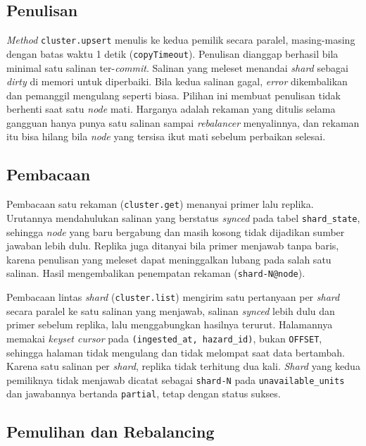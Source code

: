 \subsection{Penulisan}

\textit{Method} \texttt{cluster.upsert} menulis ke kedua pemilik secara paralel, masing-masing dengan batas waktu 1 detik (\texttt{copyTimeout}). Penulisan dianggap berhasil bila minimal satu salinan ter-\textit{commit}. Salinan yang meleset menandai \textit{shard} sebagai \textit{dirty} di memori untuk diperbaiki. Bila kedua salinan gagal, \textit{error} dikembalikan dan pemanggil mengulang seperti biasa. Pilihan ini membuat penulisan tidak berhenti saat satu \textit{node} mati. Harganya adalah rekaman yang ditulis selama gangguan hanya punya satu salinan sampai \textit{rebalancer} menyalinnya, dan rekaman itu bisa hilang bila \textit{node} yang tersisa ikut mati sebelum perbaikan selesai.

\subsection{Pembacaan}

Pembacaan satu rekaman (\texttt{cluster.get}) menanyai primer lalu replika. Urutannya mendahulukan salinan yang berstatus \textit{synced} pada tabel \texttt{shard\_state}, sehingga \textit{node} yang baru bergabung dan masih kosong tidak dijadikan sumber jawaban lebih dulu. Replika juga ditanyai bila primer menjawab tanpa baris, karena penulisan yang meleset dapat meninggalkan lubang pada salah satu salinan. Hasil mengembalikan penempatan rekaman (\texttt{shard-N@node}).

Pembacaan lintas \textit{shard} (\texttt{cluster.list}) mengirim satu pertanyaan per \textit{shard} secara paralel ke satu salinan yang menjawab, salinan \textit{synced} lebih dulu dan primer sebelum replika, lalu menggabungkan hasilnya terurut. Halamannya memakai \textit{keyset cursor} pada \texttt{(ingested\_at, hazard\_id)}, bukan \texttt{OFFSET}, sehingga halaman tidak mengulang dan tidak melompat saat data bertambah. Karena satu salinan per \textit{shard}, replika tidak terhitung dua kali. \textit{Shard} yang kedua pemiliknya tidak menjawab dicatat sebagai \texttt{shard-N} pada \texttt{unavailable\_units} dan jawabannya bertanda \texttt{partial}, tetap dengan status sukses.

\subsection{Pemulihan dan Rebalancing}

